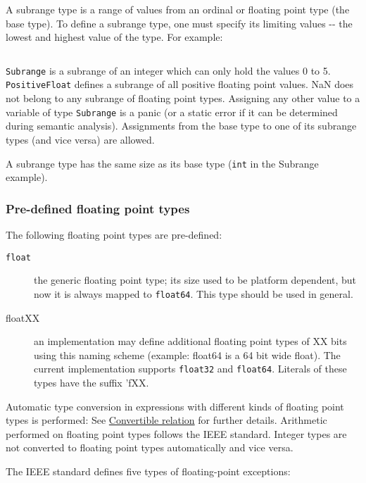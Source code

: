 A subrange type is a range of values from an ordinal or floating point
type (the base type). To define a subrange type, one must specify its
limiting values -\/- the lowest and highest value of the type. For
example:

\begin{verbatim}
\end{verbatim}

\texttt{Subrange} is a subrange of an integer which can only hold the
values 0 to 5. \texttt{PositiveFloat} defines a subrange of all positive
floating point values. NaN does not belong to any subrange of floating
point types. Assigning any other value to a variable of type
\texttt{Subrange} is a panic (or a static error if it can be determined
during semantic analysis). Assignments from the base type to one of its
subrange types (and vice versa) are allowed.

A subrange type has the same size as its base type (\texttt{int} in the
Subrange example).

\hypertarget{pre-defined-floating-point-types}{%
\subsubsection{Pre-defined floating point
types}\label{pre-defined-floating-point-types}}

The following floating point types are pre-defined:

\begin{description}
\item[\texttt{float}]
the generic floating point type; its size used to be platform dependent,
but now it is always mapped to \texttt{float64}. This type should be
used in general.
\item[floatXX]
an implementation may define additional floating point types of XX bits
using this naming scheme (example: float64 is a 64 bit wide float). The
current implementation supports \texttt{float32} and \texttt{float64}.
Literals of these types have the suffix 'fXX.
\end{description}

Automatic type conversion in expressions with different kinds of
floating point types is performed: See
\protect\hyperlink{convertible-relation}{Convertible relation} for
further details. Arithmetic performed on floating point types follows
the IEEE standard. Integer types are not converted to floating point
types automatically and vice versa.

The IEEE standard defines five types of floating-point exceptions:

